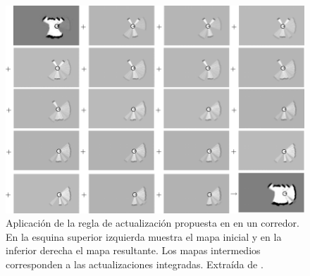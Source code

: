 \begin{figure}[H]
  \center
  \includegraphics[width=1.00\linewidth]{imagenes/occgridUpdate.png}
  \caption[Aplicación de la regla de actualización propuesta en
  \cite{stachniss2009robotic} en un corredor.]{Aplicación de la
    regla de actualización propuesta en \cite{stachniss2009robotic} en un
    corredor. En la esquina superior izquierda muestra el mapa inicial y
    en la inferior derecha el mapa resultante. Los mapas intermedios corresponden a las actualizaciones integradas. Extraída de
  \cite{stachniss2009robotic}. }
  \label{fig:mappingUpRule}
\end{figure} 







